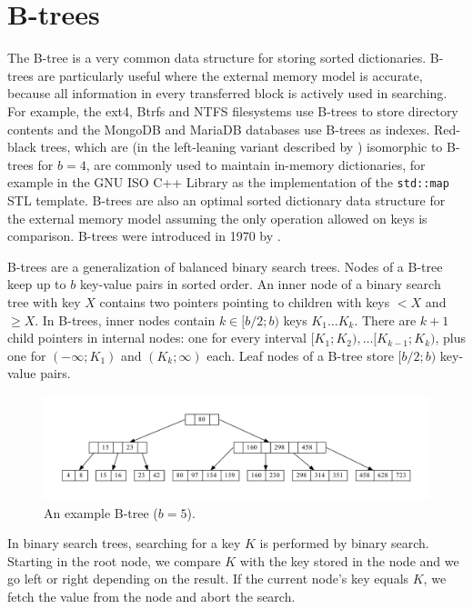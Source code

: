 \chapter{B-trees}
\label{chapter:btree}
The B-tree is a very common data structure for storing sorted dictionaries.
B-trees are particularly useful where the external memory model is accurate,
because all information in every transferred block is actively used
in searching. For example, the ext4, Btrfs and NTFS filesystems use B-trees
to store directory contents and the MongoDB and MariaDB databases use B-trees
as indexes. Red-black trees, which are (in the left-leaning variant
described by \cite{left-leaning}) isomorphic to B-trees for $b=4$, are
commonly used to maintain in-memory dictionaries, for example in the GNU ISO
C++ Library as the implementation of the \texttt{std::map} STL template.
B-trees are also an optimal sorted dictionary data structure
for the external memory model assuming the only operation allowed on
keys is comparison.
B-trees were introduced in 1970 by \cite{btree}.

B-trees are a generalization of balanced binary search trees.
Nodes of a B-tree keep up to $b$ key-value pairs in sorted order.
An inner node of a binary search tree with key $X$ contains two pointers
pointing to children with keys $< X$ and $\geq X$. In B-trees,
inner nodes contain $k\in[b/2;b)$ keys $K_1\ldots K_k$. There are $k+1$
child pointers in internal nodes: one for every interval
$[K_1;K_2),\ldots [K_{k-1};K_k)$, plus one for $(-\infty;K_1)$ and
$(K_k;\infty)$ each.
Leaf nodes of a B-tree store $[b/2;b)$ key-value pairs.

\begin{figure}
\centering
\includegraphics[width=\linewidth]{img/btree}
\caption{An example B-tree ($b=5$).}
\end{figure}

In binary search trees, searching for a key $K$ is performed by binary search.
Starting in the root node, we compare $K$ with the key stored in the node
and we go left or right depending on the result. If the current node's key
equals $K$, we fetch the value from the node and abort the search.

